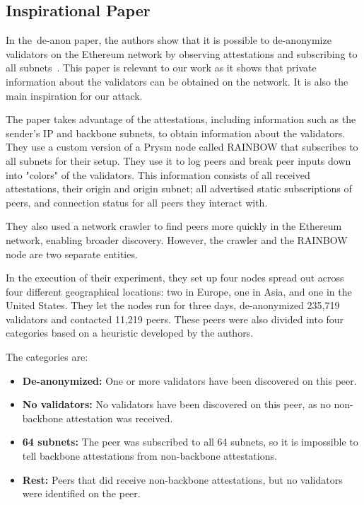 \subsection{Inspirational Paper}\label{subsec:inspirational-papers}

In the~\gls{de-anon paper}, the authors show that it is possible to de-anonymize validators on the Ethereum network by observing attestations and subscribing to all subnets~\cite{heimbach2024deanonymizingethereumvalidatorsp2p}.
This paper is relevant to our work as it shows that private information about the validators can be obtained on the network.
It is also the main inspiration for our attack.

The paper takes advantage of the attestations, including information such as the sender's IP and backbone subnets, to obtain information about the validators.
They use a custom version of a Prysm node called RAINBOW that subscribes to all subnets for their setup.
They use it to log peers and break peer inputs down into "colors" of the validators.
This information consists of all received attestations, their origin and origin subnet; all advertised static subscriptions of peers, and connection status for all peers they interact with.

They also used a network crawler to find peers more quickly in the Ethereum network, enabling broader discovery.
However, the crawler and the RAINBOW node are two separate entities.

In the execution of their experiment, they set up four nodes spread out across four different geographical locations: two in Europe, one in Asia, and one in the United States.
They let the nodes run for three days, de-anonymized 235,719 validators and contacted 11,219 peers.
These peers were also divided into four categories based on a heuristic developed by the authors.

The categories are:
\begin{itemize}
    \item \textbf{De-anonymized:} One or more validators have been discovered on this peer.
    \item \textbf{No validators:} No validators have been discovered on this peer, as no non-backbone attestation was received.
    \item \textbf{64 subnets:} The peer was subscribed to all 64 subnets, so it is impossible to tell backbone attestations from non-backbone attestations.
    \item \textbf{Rest:} Peers that did receive non-backbone attestations, but no validators were identified on the peer.
\end{itemize}

